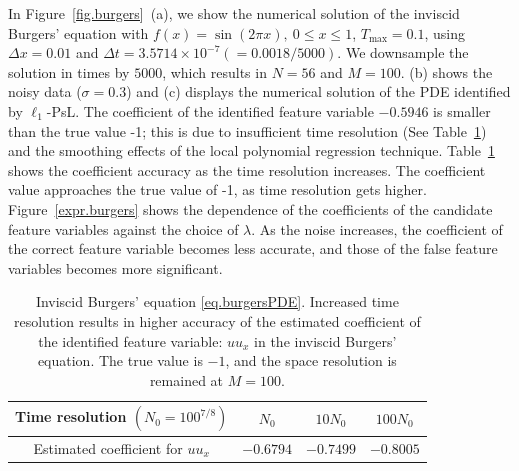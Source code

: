 \documentclass[a4paper,11pt]{article}
\theoremstyle{definition}
\begin{document}
In Figure~\ref{fig.burgers}~(a), we show the numerical solution of the inviscid Burgers' equation with $f(x)=\sin(2\pi x),~0\leq x\leq 1$, $T_{\max}=0.1$, using $\Delta x = 0.01$ and $\Delta t=3.5714\times 10^{-7} (=0.0018/5000)$. We  downsample the solution in times by $5000$, which results in $N=56$ and $M=100$. (b) shows the noisy data ($\sigma=0.3$) and  (c) displays the numerical solution of the PDE identified by $\ell_1$-PsL. The coefficient of the identified feature variable $-0.5946$ is  smaller than the true value -1; this is due to insufficient time resolution (See Table~\ref{tab.coeff.burgers}) and the smoothing effects of the local polynomial regression technique.  Table~\ref{tab.coeff.burgers} shows the coefficient accuracy as the time resolution increases.  The coefficient value approaches the true value of -1, as time resolution gets higher.   Figure~\ref{expr.burgers} shows the dependence of the coefficients of the candidate feature variables against the choice of $\lambda$. As the noise increases, the coefficient of the correct feature variable becomes less accurate, and those of the false feature variables becomes more significant.
\begin{table}
\centering
\begin{tabular}{|c|c|c|c|}
\hline
Time resolution $(N_0=100^{7/8})$&$N_0$&$10N_0$&$100N_0$\\\hline
Estimated coefficient for $uu_x$&$-0.6794$&$-0.7499$&$-0.8005$ \\
\hline
\end{tabular}	
\caption{Inviscid Burgers' equation \eqref{eq.burgersPDE}. Increased time resolution results in higher accuracy of the estimated coefficient of the identified feature variable: $uu_x$ in the inviscid Burgers' equation. The true value is $-1$, and the space resolution is remained at $M=100$.}\label{tab.coeff.burgers}
\end{table}
\end{document}
